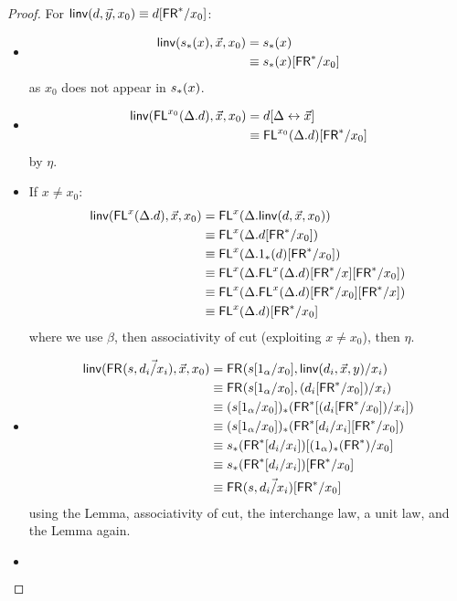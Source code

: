 \begin{proof}
For $\mathsf{linv}(d,\vec{y},x_0) \equiv d[\mathsf{FR}^*/x_0]$:
\begin{itemize}
\item \begin{align*}
\mathsf{linv}(s_*(x),\vec{x},x_0) 
&= {s_*(x)} \\
&\equiv s_*(x)[\mathsf{FR}^*/x_0]
\end{align*}
as $x_0$ does not appear in $s_*(x)$.
\item \begin{align*}
\mathsf{linv}(\mathsf{FL}^{x_0}(\Delta.d),\vec{x},x_0) 
&= d[\Delta \leftrightarrow \vec{x}]\\
&\equiv \mathsf{FL}^{x_0}(\Delta.d)[\mathsf{FR}^*/x_0]
\end{align*}
by $\eta$.
\item If $x \neq x_0$: \begin{align*}
\mathsf{linv}(\mathsf{FL}^{x}(\Delta.d),\vec{x},x_0) 
&= \mathsf{FL}^{x}(\Delta.\mathsf{linv}(d,\vec{x},x_0)) \\
&\equiv \mathsf{FL}^{x}(\Delta.d[\mathsf{FR}^*/x_0]) \\
&\equiv \mathsf{FL}^{x}(\Delta.1_*(d)[\mathsf{FR}^*/x_0]) \\
&\equiv \mathsf{FL}^{x}(\Delta.\mathsf{FL}^{x}(\Delta.d)[\mathsf{FR}^*/x][\mathsf{FR}^*/x_0]) \\
&\equiv \mathsf{FL}^{x}(\Delta.\mathsf{FL}^{x}(\Delta.d)[\mathsf{FR}^*/x_0][\mathsf{FR}^*/x]) \\
&\equiv \mathsf{FL}^{x}(\Delta.d)[\mathsf{FR}^*/x_0]
\end{align*}
where we use $\beta$, then associativity of cut (exploiting $x \neq x_0$), then $\eta$.
\item \begin{align*}
\mathsf{linv}(\mathsf{FR}_{}(s,\vec{d_i/x_i}),\vec{x},x_0) 
&= \mathsf{FR}_{}(s[1_\alpha/x_0],{{\mathsf{linv}(d_i,\vec{x},y)}/x_i}) \\
&\equiv \mathsf{FR}_{}(s[1_\alpha/x_0],(d_i[\mathsf{FR}^*/x_0])/x_i) \\
&\equiv (s[1_\alpha/x_0])_*(\mathsf{FR}^*[(d_i[\mathsf{FR}^*/x_0])/x_i]) \\
&\equiv (s[1_\alpha/x_0])_*(\mathsf{FR}^*[d_i/x_i][\mathsf{FR}^*/x_0]) \\
&\equiv s_*(\mathsf{FR}^*[d_i/x_i])[(1_\alpha)_*(\mathsf{FR}^*)/x_0] \\
&\equiv s_*(\mathsf{FR}^*[d_i/x_i])[\mathsf{FR}^*/x_0] \\
&\equiv \mathsf{FR}_{}(s,\vec{d_i/x_i})[\mathsf{FR}^*/x_0]
\end{align*}
using the Lemma, associativity of cut, the interchange law, a unit law, and the Lemma again.
\item \begin{align*}

\end{align*}
\end{itemize}
\end{proof}
